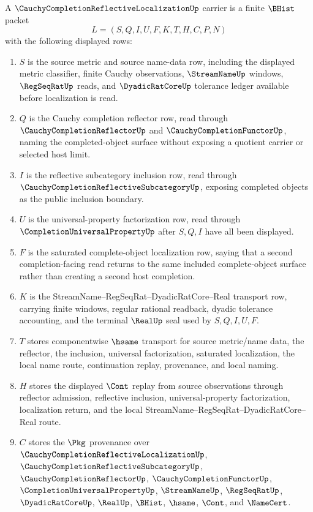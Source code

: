 \begin{definition}
\label{def:cauchy-completion-reflective-localization-carrier}
A $\CauchyCompletionReflectiveLocalizationUp$ carrier is a finite $\BHist$ packet
$$
L=(S,Q,I,U,F,K,T,H,C,P,N)
$$
with the following displayed rows:
\begin{enumerate}
\item $S$ is the source metric and source name-data row, including the displayed metric classifier, finite Cauchy observations, $\StreamNameUp$ windows, $\RegSeqRatUp$ reads, and $\DyadicRatCoreUp$ tolerance ledger available before localization is read.
\item $Q$ is the Cauchy completion reflector row, read through $\CauchyCompletionReflectorUp$ and $\CauchyCompletionFunctorUp$, naming the completed-object surface without exposing a quotient carrier or selected host limit.
\item $I$ is the reflective subcategory inclusion row, read through $\CauchyCompletionReflectiveSubcategoryUp$, exposing completed objects as the public inclusion boundary.
\item $U$ is the universal-property factorization row, read through $\CompletionUniversalPropertyUp$ after $S,Q,I$ have all been displayed.
\item $F$ is the saturated complete-object localization row, saying that a second completion-facing read returns to the same included complete-object surface rather than creating a second host completion.
\item $K$ is the StreamName--RegSeqRat--DyadicRatCore--Real transport row, carrying finite windows, regular rational readback, dyadic tolerance accounting, and the terminal $\RealUp$ seal used by $S,Q,I,U,F$.
\item $T$ stores componentwise $\hsame$ transport for source metric/name data, the reflector, the inclusion, universal factorization, saturated localization, the local name route, continuation replay, provenance, and local naming.
\item $H$ stores the displayed $\Cont$ replay from source observations through reflector admission, reflective inclusion, universal-property factorization, localization return, and the local StreamName--RegSeqRat--DyadicRatCore--Real route.
\item $C$ stores the $\Pkg$ provenance over $\CauchyCompletionReflectiveLocalizationUp$, $\CauchyCompletionReflectiveSubcategoryUp$, $\CauchyCompletionReflectorUp$, $\CauchyCompletionFunctorUp$, $\CompletionUniversalPropertyUp$, $\StreamNameUp$, $\RegSeqRatUp$, $\DyadicRatCoreUp$, $\RealUp$, $\BHist$, $\hsame$, $\Cont$, and $\NameCert$.

\end{enumerate}
\end{definition}
